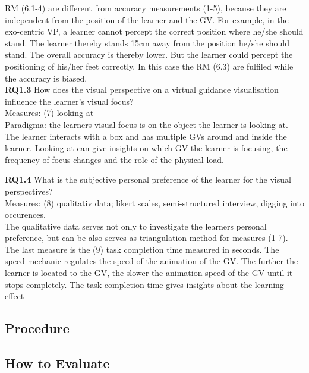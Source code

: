 RM (6.1-4) are different from accuracy measurements (1-5), because they are independent from the position of the learner and the GV. For example, in the exo-centric VP, a learner cannot percept the correct position where he/she should stand. The learner thereby stands 15cm away from the position he/she should stand. The overall accuracy is thereby lower. But the learner could percept the positioning of his/her feet correctly. In this case the RM (6.3) are fulfiled while the accuracy is biased.\\

\textbf{RQ1.3} How does the visual perspective on a virtual guidance visualisation influence the learner's visual focus?\\
Measures: (7) looking at\\
Paradigma: the learners visual focus is on the object the learner is looking at.\\
The learner interacts with a box and has multiple GVs around and inside the learner. Looking at can give insights on which GV the learner is focusing, the frequency of focus changes and the role of the physical load.

\textbf{RQ1.4} What is the subjective personal preference of the learner for the visual perspectives?\\
Measures: (8) qualitativ data; likert scales, semi-structured interview, digging into occurences.\\
The qualitative data serves not only to investigate the learners personal preference, but can be also serves as triangulation method for measures (1-7).\\

The last measure is the (9) task completion time measured in seconds. The speed-mechanic regulates the speed of the animation of the GV. The further the learner is located to the GV, the slower the animation speed of the GV until it stops completely. The task completion time gives insights about the learning effect 


\subsection{Procedure}



\subsection{How to Evaluate}

